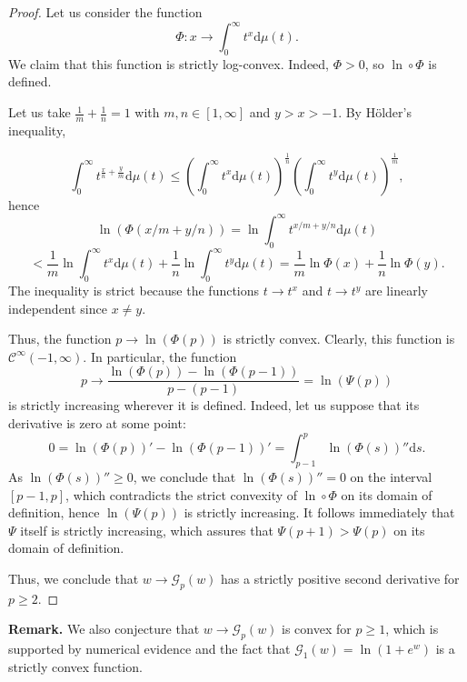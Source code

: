 \begin{subappendices}
\begin{proof}
Let us consider the function
\[\Phi:x\to \int_0^\infty t^{x}\mathrm d\mu(t).\]
We claim that this function is strictly log-convex. Indeed, $\Phi>0$, so $\ln\! 
\circ \Phi$ is defined. 

Let us take $\frac 1m +\frac 1n=1$ with $m,n\in [1,\infty]$ and $y>x>-1$. By 
H\"older's inequality, 

\[\int_0^\infty t^{\frac xn+\frac ym}\mathrm d\mu(t)\le\left(\int_0^\infty t^x \mathrm d\mu(t)\right)^{\frac 1n}\left(\int_0^\infty t^y \mathrm d\mu(t)\right)^{\frac 1m},\]
hence
\[\ln(\Phi(x/m+y/n)) = \ln\int_0^\infty t^{x/m+y/n}\mathrm d\mu(t)\]\[<\frac 
1m\ln\int_0^\infty t^{x  }\mathrm d\mu(t)+\frac 1n \ln\int_0^\infty t^{ y 
}\mathrm d\mu(t)=\frac 1m\ln \Phi(x)+\frac 1n\ln \Phi(y).\]
The inequality is strict because   the functions $t\to t^x$ and $t\to t^y$ 
are linearly independent since $x\ne y$.

Thus, the function ${p\to\ln(\Phi(p))}$ is strictly convex. Clearly, this 
function is $\mathcal C^\infty(-1,\infty)$. In particular, the function
\[p\to \frac{\ln(\Phi(p))-\ln(\Phi(p-1))}{p-(p-1)}=\ln(\Psi(p))\]
is strictly increasing wherever it is defined.
Indeed, let us suppose that its derivative is zero at some point:
\[0=\ln(\Phi(p))'-\ln(\Phi(p-1))'=\int_{p-1}^p \ln(\Phi(s))''\mathrm ds.\]
As $\ln(\Phi(s))''\ge 0$, we conclude that $\ln(\Phi(s))''=0$ on the interval 
$[p-1,p]$, which contradicts the strict convexity of $\ln \circ \Phi$ on its 
domain of definition, hence $\ln(\Psi(p))$ is strictly increasing. It follows 
immediately that $\Psi$ itself is strictly increasing, which assures that  
$\Psi(p+1)> \Psi(p)$ on its domain of definition.

Thus, we conclude that $w\to\mathcal  G_p(w)$ has a strictly positive second 
derivative for $p\ge 2$.
\end{proof}

\textbf{Remark.} We also conjecture that $w\to\mathcal  G_p(w)$ is convex for $p\ge 1$, which is supported by numerical evidence and the fact that $\mathcal G_1(w) = \ln (1+e^w)$ is a strictly convex function.

\end{subappendices}
